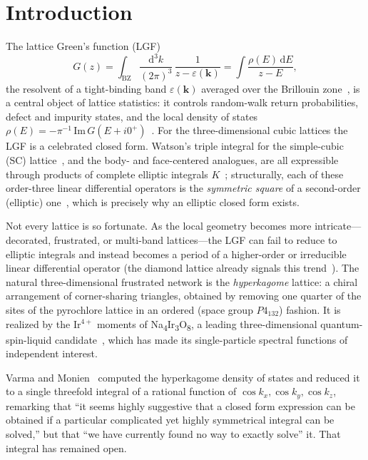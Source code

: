 \documentclass[11pt]{article}
\newcommand{\rmd}{\mathrm{d}}
\theoremstyle{plain}
\theoremstyle{remark}
\begin{document}
\section{Introduction}
The lattice Green's function (LGF)
\begin{equation}
G(z)=\int_{\mathrm{BZ}}\frac{\rmd^3k}{(2\pi)^3}\,\frac{1}{z-\varepsilon(\bm k)}
=\int\frac{\rho(E)\,\rmd E}{z-E},
\label{eq:lgf}
\end{equation}
the resolvent of a tight-binding band $\varepsilon(\bm k)$ averaged over the Brillouin zone~\cite{AshcroftMermin}, is a central object
of lattice statistics: it controls random-walk return probabilities, defect and impurity states, and the local
density of states $\rho(E)=-\pi^{-1}\,\mathrm{Im}\,G(E+i0^+)$~\cite{Economou,Guttmann2010}. For the
three-dimensional cubic lattices the LGF is a celebrated closed form. Watson's triple
integral for the simple-cubic (SC) lattice~\cite{Watson1939}, and the body- and face-centered analogues, are all
expressible through products of complete elliptic integrals $K$~\cite{Joyce1973,GlasserZucker1977,Joyce1998}; structurally,
each of these order-three linear differential operators is the \emph{symmetric square} of a second-order
(elliptic) one~\cite{BoukraaHassaniMaillard2014}, which is precisely why an elliptic closed form exists.

Not every lattice is so fortunate. As the local geometry becomes more intricate---decorated, frustrated, or
multi-band lattices---the LGF can fail to reduce to elliptic integrals and instead becomes a period of a
higher-order or irreducible linear differential operator (the diamond lattice already signals this
trend~\cite{Guttmann2010,Joyce1998}). The natural three-dimensional frustrated network is the
\emph{hyperkagome} lattice: a chiral arrangement of corner-sharing triangles, obtained by removing one quarter
of the sites of the pyrochlore lattice in an ordered (space group $P4_132$) fashion. It is realized by the Ir$^{4+}$
moments of Na\textsubscript{4}Ir\textsubscript{3}O\textsubscript{8}, a leading three-dimensional quantum-spin-liquid candidate~\cite{Okamoto2007,
Hopkinson2007,Lawler2008}, which has made its single-particle spectral functions of independent interest.

Varma and Monien~\cite{VarmaMonien2013} computed the hyperkagome density of states and reduced it to a single
threefold integral of a rational function of $\cos k_x,\cos k_y,\cos k_z$, remarking that ``it seems highly
suggestive that a closed form expression can be obtained if a particular complicated yet highly symmetrical
integral can be solved,'' but that ``we have currently found no way to exactly solve'' it. That integral has
remained open.
\end{document}
